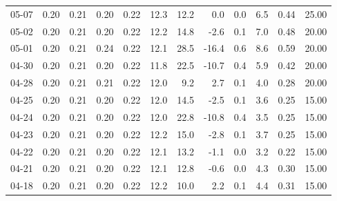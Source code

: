 \begin{threeparttable}
{\begin{tabular}{lrrrrrrrrrrr}
  05-07 &          0.20 &          0.21 &          0.20 &        0.22 &                12.3 &                12.2 &        0.0 &                 0.0 &              6.5 &            0.44 &                  25.00 \\
  05-02 &          0.20 &          0.21 &          0.20 &        0.22 &                12.2 &                14.8 &       -2.6 &                 0.1 &              7.0 &            0.48 &                  20.00 \\
  05-01 &          0.20 &          0.21 &          0.24 &        0.22 &                12.1 &                28.5 &      -16.4 &                 0.6 &              8.6 &            0.59 &                  20.00 \\
  04-30 &          0.20 &          0.21 &          0.20 &        0.22 &                11.8 &                22.5 &      -10.7 &                 0.4 &              5.9 &            0.42 &                  20.00 \\
  04-28 &          0.20 &          0.21 &          0.21 &        0.22 &                12.0 &                 9.2 &        2.7 &                 0.1 &              4.0 &            0.28 &                  20.00 \\
  04-25 &          0.20 &          0.21 &          0.20 &        0.22 &                12.0 &                14.5 &       -2.5 &                 0.1 &              3.6 &            0.25 &                  15.00 \\
  04-24 &          0.20 &          0.21 &          0.20 &        0.22 &                12.0 &                22.8 &      -10.8 &                 0.4 &              3.5 &            0.25 &                  15.00 \\
  04-23 &          0.20 &          0.21 &          0.20 &        0.22 &                12.2 &                15.0 &       -2.8 &                 0.1 &              3.7 &            0.25 &                  15.00 \\
  04-22 &          0.20 &          0.21 &          0.20 &        0.22 &                12.1 &                13.2 &       -1.1 &                 0.0 &              3.2 &            0.22 &                  15.00 \\
  04-21 &          0.20 &          0.21 &          0.20 &        0.22 &                12.1 &                12.8 &       -0.6 &                 0.0 &              4.3 &            0.30 &                  15.00 \\
  04-18 &          0.20 &          0.21 &          0.20 &        0.22 &                12.2 &                10.0 &        2.2 &                 0.1 &              4.4 &            0.31 &                  15.00 \\

\end{tabular}}
\end{threeparttable}
